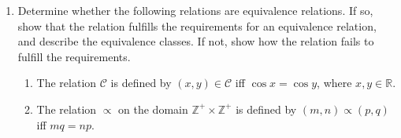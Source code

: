 \documentclass{article}
\newcommand{\R}{\mathbb{R}}
\newcommand{\Z}{\mathbb{Z}}
\begin{document}
\begin{enumerate}
\item Determine whether the following relations are equivalence relations. If so, show that the relation fulfills the requirements for an equivalence relation, and describe the equivalence classes.  If not, show how the relation fails to fulfill the requirements.
\begin{enumerate}
\item The relation $\mathcal{C}$ is defined by $(x,y) \in \mathcal{C}$ iff $\cos x = \cos y$, where $x,y \in \R$.
\item The relation $\propto$ on the domain $\Z^+ \times \Z^+$ is defined by $(m,n)\propto(p,q)$ iff $mq = np$. 
\end{enumerate}


\end{enumerate}
\end{document}
